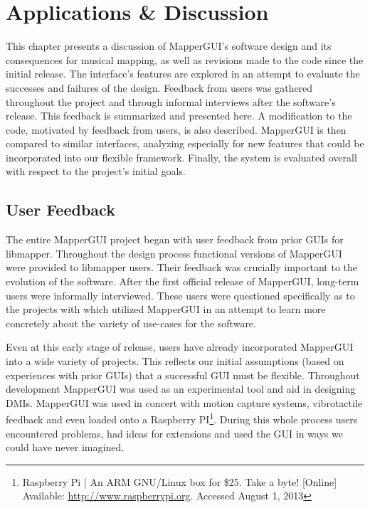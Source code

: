 \chapter{Applications \& Discussion}

This chapter presents a discussion of MapperGUI's software design and its consequences for musical mapping, as well as revisions made to the code since the initial release. The interface's features are explored in an attempt to evaluate the successes and failures of the design. Feedback from users was gathered throughout the project and through informal interviews after the software's release. This feedback is summarized and presented here. A modification to the code, motivated by feedback from users, is also described. MapperGUI is then compared to similar interfaces, analyzing especially for new features that could be incorporated into our flexible framework. Finally, the system is evaluated overall with respect to the project's initial goals.


\section{User Feedback} %
\label{sec:user_feedback}

The entire MapperGUI project began with user feedback from prior GUIs for libmapper. Throughout the design process functional versions of MapperGUI were provided to libmapper users. Their feedback was crucially important to the evolution of the software. After the first official release of MapperGUI, long-term users were informally interviewed. These users were questioned specifically as to the projects with which utilized MapperGUI in an attempt to learn more concretely about the variety of use-cases for the software.

Even at this early stage of release, users have already incorporated MapperGUI into a wide variety of projects. This reflects our initial assumptions (based on experiences with prior GUIs) that a successful GUI must be flexible. Throughout development MapperGUI was used as an experimental tool and aid in designing DMIs. MapperGUI was used in concert with motion capture systems, vibrotactile feedback and even loaded onto a Raspberry PI\footnote{Raspberry Pi | An ARM GNU/Linux box for \$25. Take a byte! [Online] Available: \url{http://www.raspberrypi.org}. Accessed August 1, 2013}. During this whole process users encountered problems, had ideas for extensions and used the GUI in ways we could have never imagined.



